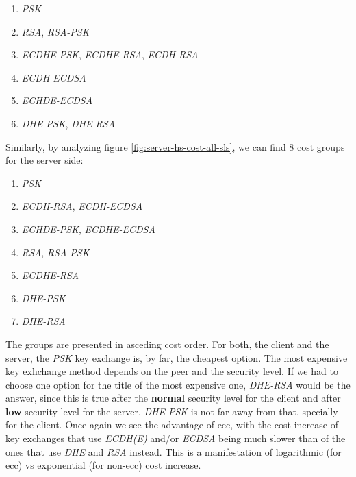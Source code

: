 \documentclass{llncs}
\begin{document}
\begin{enumerate}
  \item \textit{PSK}
  \item \textit{RSA}, \textit{RSA-PSK}
  \item \textit{ECDHE-PSK}, \textit{ECDHE-RSA}, \textit{ECDH-RSA}
  \item \textit{ECDH-ECDSA}
  \item \textit{ECHDE-ECDSA}
  \item \textit{DHE-PSK}, \textit{DHE-RSA}
\end{enumerate}

Similarly, by analyzing figure \ref{fig:server-hs-cost-all-sls}, we can find $8$ cost groups for the server side:

\begin{enumerate}
  \item \textit{PSK}
  \item \textit{ECDH-RSA}, \textit{ECDH-ECDSA}
  \item \textit{ECHDE-PSK}, \textit{ECDHE-ECDSA}
  \item \textit{RSA}, \textit{RSA-PSK}
  \item \textit{ECDHE-RSA}
  \item \textit{DHE-PSK}
  \item \textit{DHE-RSA}
\end{enumerate}

The groups are presented in asceding cost order. For both, the client and the server, the \textit{PSK} key exchange is, by far,
the cheapest option. The most expensive key exhchange method depends on the peer and the security level. If we had to choose one
option for the title of the most expensive one, \textit{DHE-RSA} would be the answer, since this is true after the
\textbf{normal} security level for the client and after \textbf{low} security level for the server. \textit{DHE-PSK} is not
far away from that, specially for the client. Once again we see the advantage of \gls{ecc}, with the cost increase of 
key exchanges that use \textit{ECDH(E)} and/or \textit{ECDSA} being much slower than of the ones that use \textit{DHE} and \textit{RSA}
instead. This is a manifestation of logarithmic (for \gls{ecc}) vs exponential (for non-\gls{ecc}) cost increase.
\end{document}
